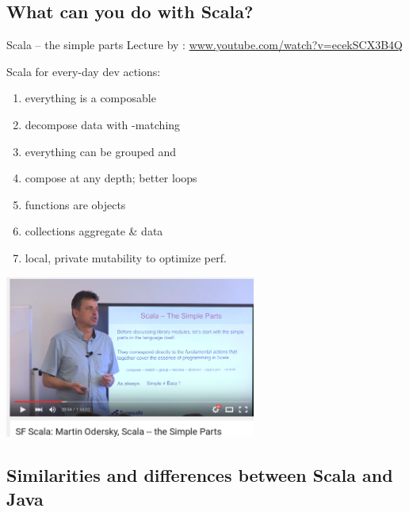 \documentclass{lecturenotes}
\begin{document}
\subsection[What can you do with Scala?]{What can you do with Scala?}
\begin{Slide}{Scala -- the simple parts}
\fontsize{9}{11}\selectfont
Lecture by : \href{https://www.youtube.com/watch?v=ecekSCX3B4Q}{www.youtube.com/watch?v=ecekSCX3B4Q}

\begin{multicols}{2}
\fontsize{9}{11}\selectfont
Scala for every-day dev actions:

\begin{enumerate}
\item {} everything is a composable 
\item {} decompose data with -matching
\item {} everything can be grouped and 
\item {} compose at any depth; better loops 
\item {} functions are objects
\item {} collections aggregate \&  data
\item {} local, private mutability to optimize perf.
\end{enumerate}

\columnbreak

\includegraphics[width=0.62\textwidth]{img/odersky}

\end{multicols}
\end{Slide}

\subsection[Scala versus Java]{Similarities and differences between Scala and Java}
\end{document}
